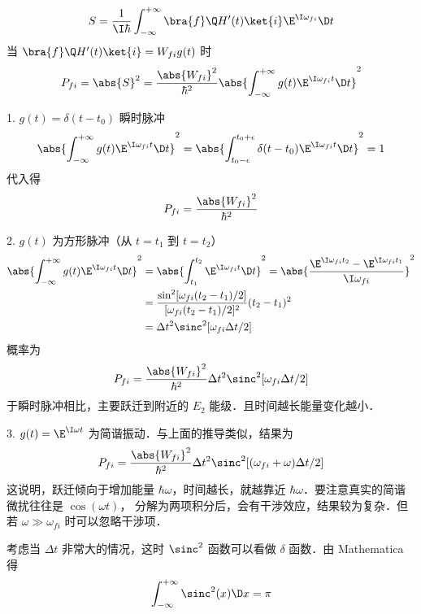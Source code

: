 
\begin{equation}
S = \frac{1}{\I\hbar} \int_{-\infty}^{+\infty} \bra{f}\Q H'(t)\ket{i} \E^{\I\omega_{fi}} \D t
\end{equation}
当 $\bra{f}\Q H'(t)\ket{i} = W_{fi} g(t)$ 时
\begin{equation}
P_{fi} = \abs{S}^2 = \frac{\abs{W_{fi}}^2}{\hbar^2} \abs{\int_{-\infty}^{+\infty} g(t) \E^{\I\omega_{fi} t} \D t}^2
\end{equation}

1. $g(t) = \delta(t-t_0)$ 瞬时脉冲
\begin{equation}
\abs{\int_{-\infty}^{+\infty} g(t) \E^{\I\omega_{fi}t} \D t}^2
= \abs{\int_{t_0-\epsilon}^{t_0+\epsilon} \delta(t-t_0) \E^{\I\omega_{fi} t}\D t}^2
= 1
\end{equation}
代入得
\begin{equation}
P_{fi} = \frac{\abs{W_{fi}}^2}{\hbar^2}
\end{equation}


2. $g(t)$ 为方形脉冲（从 $t=t_1$ 到 $t=t_2$）
\begin{equation}\begin{aligned}
\abs{\int_{-\infty}^{+\infty} g(t) \E^{\I\omega_{fi}t} \D t}^2
&= \abs{\int_{t_1}^{t_2} \E^{\I\omega_{fi}t} \D t}^2
= \abs{\frac{\E^{\I\omega_{fi}t_2}-\E^{\I\omega_{fi}t_1}}{\I\omega_{fi}}}^2\\
&= \frac{\sin^2[\omega_{fi}(t_2-t_1)/2]}{[\omega_{fi}(t_2-t_1)/2]^2} (t_2-t_1)^2 \\
&= \Delta t^2 \sinc^2[\omega_{fi}\Delta t/2]
\end{aligned}\end{equation}
概率为
\begin{equation}
P_{fi} = \frac{\abs{W_{fi}}^2}{\hbar^2} \Delta t^2 \sinc^2[\omega_{fi}\Delta t/2]
\end{equation}
于瞬时脉冲相比，主要跃迁到附近的 $E_2$ 能级．且时间越长能量变化越小．


3. $g(t)= \E^{\I\omega t}$ 为简谐振动．与上面的推导类似，结果为
\begin{equation}
P_{fi} = \frac{\abs{W_{fi}}^2}{\hbar^2} \Delta t^2 \sinc^2[(\omega_{fi}+\omega)\Delta t/2]
\end{equation}
这说明，跃迁倾向于增加能量 $\hbar\omega$，时间越长，就越靠近 $\hbar\omega$．要注意真实的简谐微扰往往是 $\cos(\omega t)$， 分解为两项积分后，会有干涉效应，结果较为复杂．但若 $\omega \gg \omega_{fi}$ 时可以忽略干涉项．

考虑当 $\Delta t$ 非常大的情况，这时 $\sinc^2$ 函数可以看做 $\delta$ 函数．由 Mathematica 得
\begin{equation}
\int_{-\infty}^{+\infty} \sinc^2(x) \D x = \pi
\end{equation}



 

